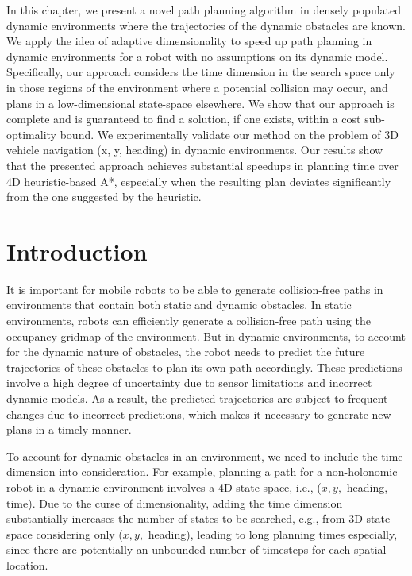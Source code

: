 In this chapter, we present a novel path planning algorithm in densely populated dynamic environments where the trajectories of the dynamic obstacles are known. We apply the idea of adaptive dimensionality to speed up path planning in dynamic environments for a robot with no assumptions on its dynamic model. Specifically, our approach considers the time dimension in the search space only in those regions of the environment where a potential collision may occur, and plans in a low-dimensional state-space elsewhere. We show that our approach is complete and is guaranteed to find a solution, if one exists, within a cost sub-optimality bound. We experimentally validate our method on the problem of 3D vehicle navigation (x, y, heading) in dynamic environments. Our results show that the presented approach achieves substantial speedups in planning time over 4D heuristic-based A*, especially when the resulting plan deviates significantly from the one suggested by the heuristic.

\section{Introduction}
\label{sec:ppad-introduction}

It is important for mobile robots to be able to generate collision-free paths in environments that contain both static and dynamic obstacles.
In static environments, robots can efficiently generate a collision-free path using the occupancy gridmap of the environment. But in dynamic environments, to account for the dynamic nature of obstacles, the robot needs to predict the future trajectories of these obstacles to plan its own path accordingly. These predictions involve a high degree of uncertainty due to sensor limitations and incorrect dynamic models. As a result, the predicted trajectories are subject to frequent changes due to incorrect predictions, which makes it necessary to generate new plans in a timely manner.

To account for dynamic obstacles in an environment, we need to include the time dimension into consideration. 
For example, planning a path for a non-holonomic robot in a dynamic environment involves a 4D state-space, i.e., ($x, y,$ heading, time). 
Due to the curse of dimensionality, adding the time dimension substantially increases the number of states to be searched, e.g., from 3D state-space considering only ($x, y,$ heading), leading to long planning times especially, since there are potentially an unbounded number of timesteps for each spatial location.  


